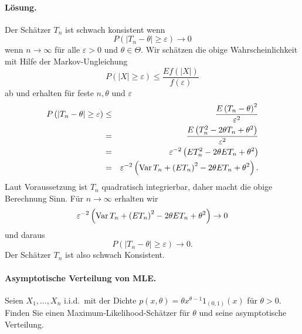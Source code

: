 \paragraph*{Lösung.} Der Schätzer $T_n$ ist schwach konsistent wenn
\begin{equation}
    P\left( |T_n -\theta|\geq \varepsilon \right) \to 0
\end{equation}
wenn $n\to\infty$ für alle $\varepsilon>0$ und $\theta\in\Theta$. Wir schätzen die obige
Wahrscheinlichkeit mit Hilfe der Markov-Ungleichung
\begin{equation}
    P\left( |X|\geq \varepsilon \right) \leq \frac{E f(|X|)}{f(\varepsilon)}
\end{equation}
ab und erhalten für feste $n,\theta$ und $\varepsilon$
\begin{eqnarray}
    P\left( |T_n -\theta|\geq \varepsilon \right) &\leq& \frac{E \left( T_n -\theta \right)^2}{\varepsilon^2} \\
    &=& \frac{E \left( T_n^2 -2\theta T_n + \theta^2 \right) }{\varepsilon^2} \\
    &=& \varepsilon^{-2}\left( E T_n^2 - 2\theta E T_n + \theta^2 \right) \\
    &=& \varepsilon^{-2}\left( \operatorname{Var} T_n + \left( E T_n \right)^2 - 2\theta E T_n + \theta^2 \right).
\end{eqnarray}
Laut Voraussetzung ist $T_n$ quadratisch integrierbar, daher macht die obige Berechnung Sinn.
Für $n\to\infty$ erhalten wir
\begin{equation}
    \varepsilon^{-2}\left( \operatorname{Var} T_n + \left( E T_n \right)^2 - 2\theta E T_n + \theta^2 \right) \to 0
\end{equation}
und daraus
\begin{equation}
    P\left( |T_n -\theta|\geq \varepsilon \right) \to 0.
\end{equation}
Der Schätzer $T_n$ ist also schwach Konsistent.







\paragraph{Asymptotische Verteilung von MLE.   }   Seien $X_1,\ldots,X_n$ i.i.d.\ mit 
der Dichte $p(x,\theta)= \theta x^{\theta-1}1_{(0,1)}(x)$ für $\theta>0$. Finden Sie 
einen Maximum-Likelihood-Schätzer für $\theta$ und seine asymptotische Verteilung.


